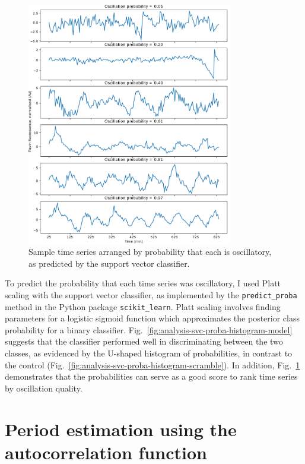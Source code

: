 \begin{figure}
  \centering
  \includegraphics[width=0.8\textwidth]{svm_3_edit.pdf}

  \caption{
    Sample time series arranged by probability that each is oscillatory, as predicted by the support vector classifier.
  }
  \label{fig:analysis-svc-proba-gallery}
\end{figure}

To predict the probability that each time series was oscillatory, I used Platt scaling  \parencite{plattProbabilisticOutputsSupport1999} with the support vector classifier, as implemented by the \texttt{predict\_proba} method in the Python package \texttt{scikit\_learn}.
Platt scaling involves finding parameters for a logistic sigmoid function which approximates the posterior class probability for a binary classifier.
Fig.\ \ref{fig:analysis-svc-proba-histogram-model} suggests that the classifier performed well in discriminating between the two classes, as evidenced by the U-shaped histogram of probabilities, in contrast to the control (Fig.\ \ref{fig:analysis-svc-proba-histogram-scramble}).
In addition, Fig.\ \ref{fig:analysis-svc-proba-gallery} demonstrates that the probabilities can serve as a good score to rank time series by oscillation quality.


\section{Period estimation using the autocorrelation function}
\label{sec:analysis-characterisation}

